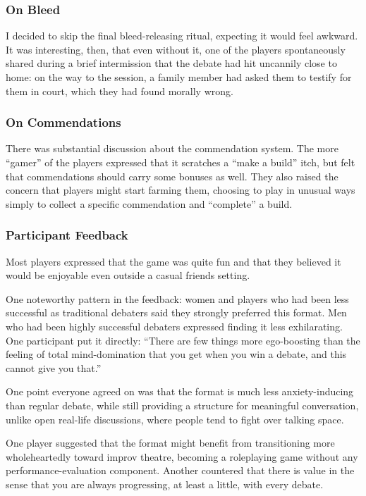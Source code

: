 \subsubsection{On Bleed}

I decided to skip the final bleed-releasing ritual, expecting it would feel awkward. It was interesting, then, that even without it, one of the players spontaneously shared during a brief intermission that the debate had hit uncannily close to home: on the way to the session, a family member had asked them to testify for them in court, which they had found morally wrong.

\subsubsection{On Commendations}

There was substantial discussion about the commendation system. The more ``gamer'' of the players expressed that it scratches a ``make a build'' itch, but felt that commendations should carry some bonuses as well. They also raised the concern that players might start farming them, choosing to play in unusual ways simply to collect a specific commendation and ``complete'' a build.

\subsubsection{Participant Feedback}

Most players expressed that the game was quite fun and that they believed it would be enjoyable even outside a casual friends setting.

One noteworthy pattern in the feedback: women and players who had been less successful as traditional debaters said they strongly preferred this format. Men who had been highly successful debaters expressed finding it less exhilarating. One participant put it directly: ``There are few things more ego-boosting than the feeling of total mind-domination that you get when you win a debate, and this cannot give you that.''

One point everyone agreed on was that the format is much less anxiety-inducing than regular debate, while still providing a structure for meaningful conversation, unlike open real-life discussions, where people tend to fight over talking space.

One player suggested that the format might benefit from transitioning more wholeheartedly toward improv theatre, becoming a roleplaying game without any performance-evaluation component. Another countered that there is value in the sense that you are always progressing, at least a little, with every debate.


